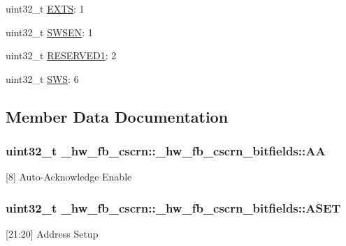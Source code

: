 \begin{DoxyCompactItemize}
\item 
uint32\+\_\+t \hyperlink{struct__hw__fb__cscrn_1_1__hw__fb__cscrn__bitfields_af12e5da35fd0ea076b39ff44aee7db23}{E\+X\+TS}\+: 1
\item 
uint32\+\_\+t \hyperlink{struct__hw__fb__cscrn_1_1__hw__fb__cscrn__bitfields_aff768f01841d79d74f17e7d90eeaa8dd}{S\+W\+S\+EN}\+: 1
\item 
uint32\+\_\+t \hyperlink{struct__hw__fb__cscrn_1_1__hw__fb__cscrn__bitfields_addd7f0ffca2053513633a1748e33b8df}{R\+E\+S\+E\+R\+V\+E\+D1}\+: 2
\item 
uint32\+\_\+t \hyperlink{struct__hw__fb__cscrn_1_1__hw__fb__cscrn__bitfields_a06a9ec5ec2f9ebc89e75cd088369ad79}{S\+WS}\+: 6
\end{DoxyCompactItemize}


\subsection{Member Data Documentation}
\subsubsection[{\texorpdfstring{AA}{AA}}]{\setlength{\rightskip}{0pt plus 5cm}uint32\+\_\+t \+\_\+hw\+\_\+fb\+\_\+cscrn\+::\+\_\+hw\+\_\+fb\+\_\+cscrn\+\_\+bitfields\+::\+AA}\hypertarget{struct__hw__fb__cscrn_1_1__hw__fb__cscrn__bitfields_a01d5d7c564c88f4664932fa6cc1558bd}{}\label{struct__hw__fb__cscrn_1_1__hw__fb__cscrn__bitfields_a01d5d7c564c88f4664932fa6cc1558bd}
\mbox{[}8\mbox{]} Auto-\/\+Acknowledge Enable 
\subsubsection[{\texorpdfstring{A\+S\+ET}{ASET}}]{\setlength{\rightskip}{0pt plus 5cm}uint32\+\_\+t \+\_\+hw\+\_\+fb\+\_\+cscrn\+::\+\_\+hw\+\_\+fb\+\_\+cscrn\+\_\+bitfields\+::\+A\+S\+ET}\hypertarget{struct__hw__fb__cscrn_1_1__hw__fb__cscrn__bitfields_a3e5d35f3fcf5aca7380cdc1b9558ecd5}{}\label{struct__hw__fb__cscrn_1_1__hw__fb__cscrn__bitfields_a3e5d35f3fcf5aca7380cdc1b9558ecd5}
\mbox{[}21\+:20\mbox{]} Address Setup 
